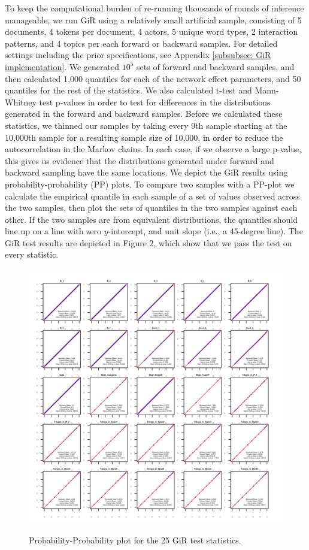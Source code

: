 \documentclass[a4paper]{article}
\begin{document}
To keep the computational burden of re-running thousands of rounds of inference manageable, we run GiR using a relatively small artificial sample, consisting of 5 documents, 4 tokens per document, 4 actors, 5 unique word types, 2 interaction patterns, and 4 topics per each forward or backward samples. For detailed settings including the prior specifications, see Appendix \ref{subsubsec: GiR implementation}. 
We generated $10^5$ sets of forward and backward samples, and then calculated 1,000 quantiles for each of the network effect parameters, and 50 quantiles for the rest of the statistics. We also calculated t-test and Mann-Whitney test p-values in order to test for differences in the distributions generated in the forward and backward samples. Before we calculated these statistics, we thinned our samples 
by taking every 9th sample starting at the 10,000th sample for a resulting sample size of 10,000, in order to reduce the autocorrelation in the Markov chains. In each case, if we observe a large p-value, this gives us evidence that the distributions generated under forward and backward sampling have the same locations. We depict the GiR results using probability-probability (PP) plots. To compare two samples with a PP-plot we calculate the empirical quantile in each sample of a set of values observed across the two samples, then plot the sets of quantiles in the two samples against each other. If the two samples are from equivalent distributions, the quantiles should line up on a line with zero $y$-intercept, and unit slope (i.e., a 45-degree line). The GiR test results are depicted in Figure 2, which show that we pass the test on every statistic.
\begin{figure}[ht]
	\centering
	\includegraphics[width=1\textwidth]{plots/Schein.png} 
	\label{fig:PPplot}
	\caption{Probability-Probability plot for the 25 GiR test statistics.}
\end{figure}
\end{document}

